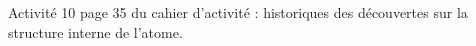 \begin{myact}{}
	Activité 10 page 35 du cahier d'activité : historiques des découvertes sur la structure interne de l'atome.
\end{myact}